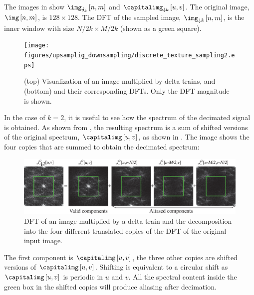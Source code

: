 The images in \fig{\ref{fig:discrete_texture_sampling}} show $\img_{\delta_k} \left[n,m\right]$ and $\capitalimg_{\downarrow k} \left[u,v\right]$. The original image, $\img \left[n,m\right]$, is $128 \times 128$. The DFT of the sampled image, $\img_{\downarrow k} \left[n,m\right]$, is the inner window with size $N/2k \times M/2k$ (shown as a green square).

\begin{figure}[h]
	\centerline{
		\texttt{[image: figures/upsamplig\_downsampling/discrete\_texture\_sampling2.eps]}
	}
	\caption{(top) Visualization of an image multiplied by delta trains, and (bottom) and their corresponding DFTs. Only the DFT magnitude is shown.}
	\label{fig:discrete_texture_sampling}
\end{figure}

In the case of $k=2$, it is useful to see how the spectrum of the decimated signal is obtained. As shown from \eqn{\ref{eq:decimationFT}}, the resulting spectrum is a sum of shifted versions of the original spectrum, $\capitalimg \left[u,v\right]$, as shown in \fig{\ref{fig:components_aliasing_FT}}. The image shows the four copies that are summed to obtain the decimated spectrum:


\begin{figure}[h]
	\centerline{
		\includegraphics[width=1\linewidth]{figures/upsamplig_downsampling/components_aliasing_FT2.eps}
	}
	\caption{DFT of an image multiplied by a delta train and the decomposition into the four different translated copies of the DFT of the original input image.}
	\label{fig:components_aliasing_FT}
\end{figure}

The first component is $\capitalimg \left[u,v\right]$, the three other copies are shifted versions of $\capitalimg \left[u,v\right]$. Shifting is equivalent to a circular shift as $\capitalimg \left[u,v\right]$ is periodic in $u$ and $v$. All the spectral content inside the green box in the shifted copies will produce aliasing after decimation.

